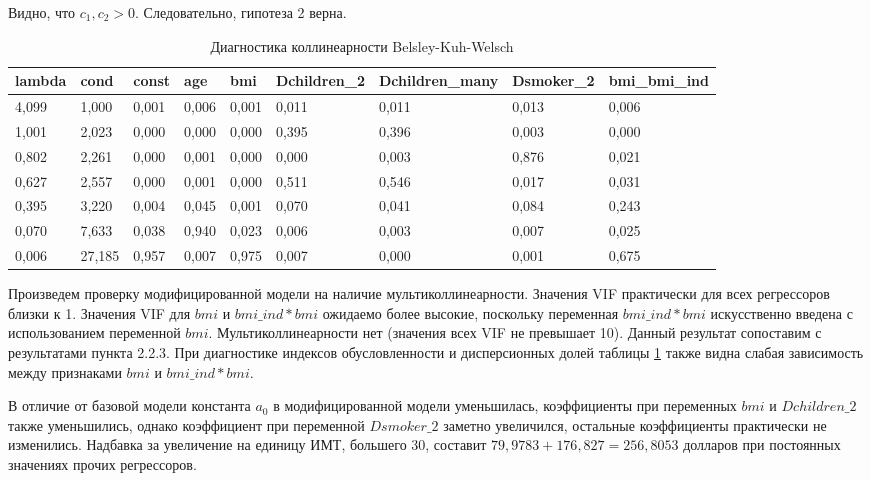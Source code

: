 \documentclass[a4paper,12pt]{article}
\begin{document}
Видно, что $c_1, c_2 >0$. Следовательно, гипотеза 2 верна.

\begin{table}[H]
	\begin{adjustbox}{width=\linewidth}
	\begin{tabular}{|l|l|l|l|l|l|l|l|l|}
		\hline
		lambda & cond   & const & age   & bmi   & Dchildren\_2 & Dchildren\_many & Dsmoker\_2 & bmi\_bmi\_ind \\ \hline
		4,099  & 1,000  & 0,001 & 0,006 & 0,001 & 0,011        & 0,011           & 0,013      & 0,006         \\ \hline
		1,001  & 2,023  & 0,000 & 0,000 & 0,000 & 0,395        & 0,396           & 0,003      & 0,000         \\ \hline
		0,802  & 2,261  & 0,000 & 0,001 & 0,000 & 0,000        & 0,003           & 0,876      & 0,021         \\ \hline
		0,627  & 2,557  & 0,000 & 0,001 & 0,000 & 0,511        & 0,546           & 0,017      & 0,031         \\ \hline
		0,395  & 3,220  & 0,004 & 0,045 & 0,001 & 0,070        & 0,041           & 0,084      & 0,243         \\ \hline
		0,070  & 7,633  & 0,038 & 0,940 & 0,023 & 0,006        & 0,003           & 0,007      & 0,025         \\ \hline
		0,006  & 27,185 & 0,957 & 0,007 & 0,975 & 0,007        & 0,000           & 0,001      & 0,675         \\ \hline
	\end{tabular}
\end{adjustbox}
\caption{Диагностика коллинеарности Belsley-Kuh-Welsch}
\label{tab:bmi-model_bkw}
\end{table}

Произведем проверку модифицированной модели на наличие мультиколлинеарности. Значения VIF практически для всех регрессоров близки к 1. Значения VIF для $bmi$ и $bmi\_ind * bmi$ ожидаемо более высокие, поскольку переменная $bmi\_ind * bmi$ искусственно введена с использованием переменной $bmi$. Мультиколлинеарности нет (значения всех VIF не превышает 10). Данный результат сопоставим с результатами пункта 2.2.3. При диагностике индексов обусловленности и дисперсионных долей таблицы \ref{tab:bmi-model_bkw} также видна слабая зависимость между признаками $bmi$ и $bmi\_ind * bmi$.

В отличие от базовой модели константа $a_0$ в модифицированной модели уменьшилась, коэффициенты при переменных $bmi$ и $Dchildren\_2$ также уменьшились, однако коэффициент при переменной $Dsmoker\_2$ заметно увеличился, остальные коэффициенты практически не изменились. Надбавка за увеличение на единицу ИМТ, большего 30, составит $79,9783 + 176,827 = 256,8053$ долларов при постоянных значениях прочих регрессоров.
\end{document}
